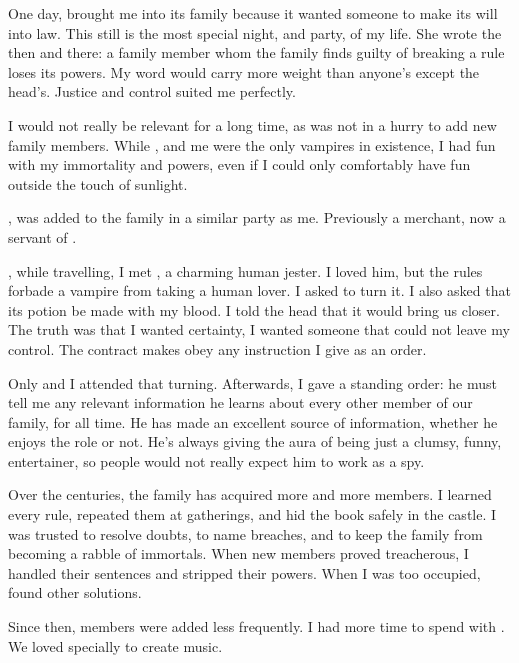 {One day,  brought me into its family because it wanted someone to make its will into law. This still is the most special night, and party, of my life. She wrote the  then and there: a family member whom the family finds guilty of breaking a rule loses its powers. My word would carry more weight than anyone's except the head's. Justice and control suited me perfectly.

I would not really be relevant for a long time, as  was not in a hurry to add new family members. While ,  and me were the only vampires in existence, I had fun with my immortality and powers, even if I could only comfortably have fun outside the touch of sunlight. 

,  was added to the family in a similar party as me. Previously a merchant, now a servant of .


, while travelling, I met , a charming human jester. I loved him, but the rules forbade a vampire from taking a human lover. I asked  to turn it. I also asked that its potion be made with my blood. I told the head that it would bring us closer. The truth was that I wanted certainty, I wanted someone that could not leave my control. The contract makes  obey any instruction I give as an order.

Only  and I attended that turning. Afterwards, I gave  a standing order: he must tell me any relevant information he learns about every other member of our family, for all time. He has made an excellent source of information, whether he enjoys the role or not. He's always giving the aura of being just a clumsy, funny, entertainer, so people would not really expect him to work as a spy.

Over the centuries, the family has acquired more and more members. I learned every rule, repeated them at gatherings, and hid the book safely in the castle. I was trusted to resolve doubts, to name breaches, and to keep the family from becoming a rabble of immortals. When new members proved treacherous, I handled their sentences and stripped their powers. When I was too occupied,  found other solutions.

Since then, members were added less frequently. I had more time to spend with . We loved specially to create music.

}
